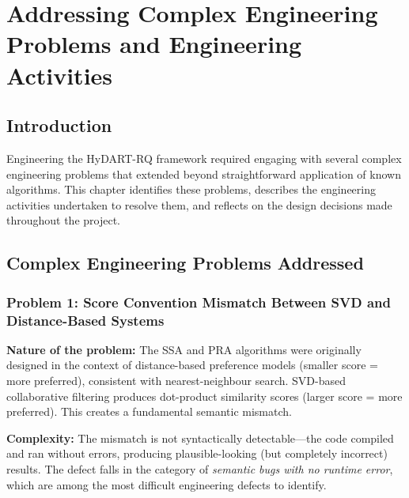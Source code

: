 \chapter{Addressing Complex Engineering Problems and Engineering Activities}
\label{ch:engineering}

\section{Introduction}

Engineering the HyDART-RQ framework required engaging with several complex engineering problems that extended beyond straightforward application of known algorithms. This chapter identifies these problems, describes the engineering activities undertaken to resolve them, and reflects on the design decisions made throughout the project.

\section{Complex Engineering Problems Addressed}

\subsection{Problem 1: Score Convention Mismatch Between SVD and Distance-Based Systems}

\textbf{Nature of the problem:} The SSA and PRA algorithms were originally designed in the context of distance-based preference models (smaller score = more preferred), consistent with nearest-neighbour search. SVD-based collaborative filtering produces dot-product similarity scores (larger score = more preferred). This creates a fundamental semantic mismatch.

\textbf{Complexity:} The mismatch is not syntactically detectable---the code compiled and ran without errors, producing plausible-looking (but completely incorrect) results. The defect falls in the category of \textit{semantic bugs with no runtime error}, which are among the most difficult engineering defects to identify.

